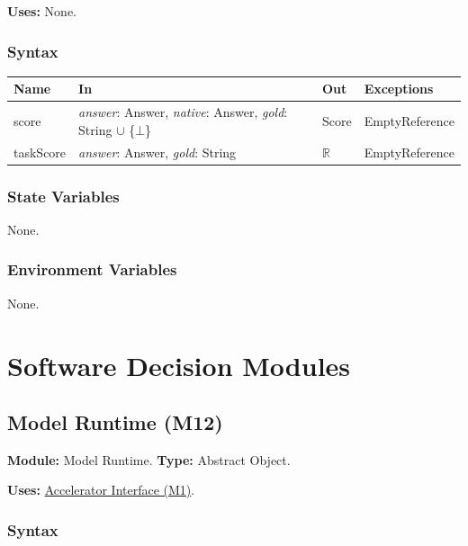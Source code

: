 \documentclass[12pt, titlepage]{article}
\begin{document}
\textbf{Uses:} None.

\subsubsection*{Syntax}

\begin{tabularx}{\textwidth}{l X l X}
\toprule
\textbf{Name} & \textbf{In} & \textbf{Out} & \textbf{Exceptions}\\
\midrule
score & \emph{answer}: Answer, \emph{native}: Answer, \emph{gold}: String $\cup$ \{$\bot$\} & Score & EmptyReference\\
taskScore & \emph{answer}: Answer, \emph{gold}: String & $\mathbb{R}$ & EmptyReference\\
\bottomrule
\end{tabularx}

\subsubsection*{State Variables}

None.

\subsubsection*{Environment Variables}

None.

\newpage
\section{Software Decision Modules}

\subsection{Model Runtime (M12)}\label{mModelRun}

\textbf{Module:} Model Runtime. \textbf{Type:} Abstract Object.

\textbf{Uses:} \hyperref[mAccel]{Accelerator Interface (M1)}.

\subsubsection*{Syntax}
\end{document}
